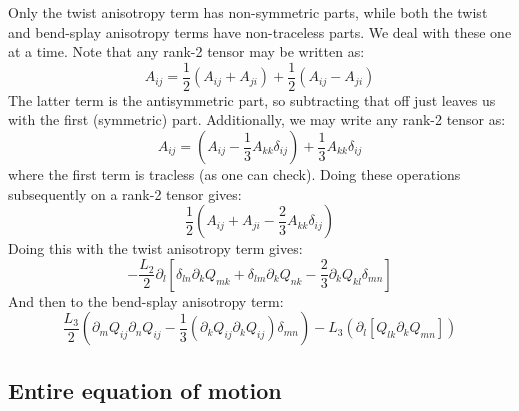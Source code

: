\documentclass[reqno]{article}
\begin{document}
Only the twist anisotropy term has non-symmetric parts, while both the twist and bend-splay anisotropy terms have non-traceless parts.
We deal with these one at a time.
Note that any rank-2 tensor may be written as:
\begin{equation}
    A_{ij}
    =
    \frac12 \left( A_{ij} + A_{ji} \right)
    + \frac12 \left( A_{ij} - A_{ji} \right)
\end{equation}
The latter term is the antisymmetric part, so subtracting that off just leaves us with the first (symmetric) part.
Additionally, we may write any rank-2 tensor as:
\begin{equation}
    A_{ij}
    =
    \left( A_{ij} - \frac13 A_{kk} \delta_{ij} \right)
    + \frac13 A_{kk} \delta_{ij}
\end{equation}
where the first term is tracless (as one can check).
Doing these operations subsequently on a rank-2 tensor gives:
\begin{equation}
    \frac12 \left( A_{ij} + A_{ji} - \frac23 A_{kk} \delta_{ij}\right) 
\end{equation}
Doing this with the twist anisotropy term gives:
\begin{equation}
    -\frac{L_2}{2} \partial_l \left[
        \delta_{ln} \partial_k Q_{mk} + \delta_{lm} \partial_k Q_{nk}
        -
        \frac23 \partial_k Q_{kl} \delta_{mn}
    \right]
\end{equation}
And then to the bend-splay anisotropy term:
\begin{equation}
    \frac{L_3}{2} \left( 
        \partial_m Q_{ij} \partial_n Q_{ij} 
        - \frac13 \left(\partial_k Q_{ij} \partial_k Q_{ij}\right) \delta_{mn} 
    \right)
    -
    L_3 \left( \partial_l \left[ Q_{lk} \partial_k Q_{mn} \right] \right)
\end{equation}

\subsection{Entire equation of motion}
\end{document}
